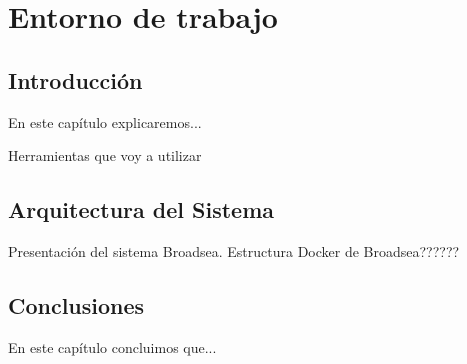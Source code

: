\chapter{Entorno de trabajo}\label{cap:07diseño}

\section{Introducción}
En este capítulo explicaremos...


Herramientas que voy a utilizar



\section{Arquitectura del Sistema}

Presentación del sistema Broadsea. Estructura Docker de Broadsea??????



\section{Conclusiones}
En este capítulo concluimos que...